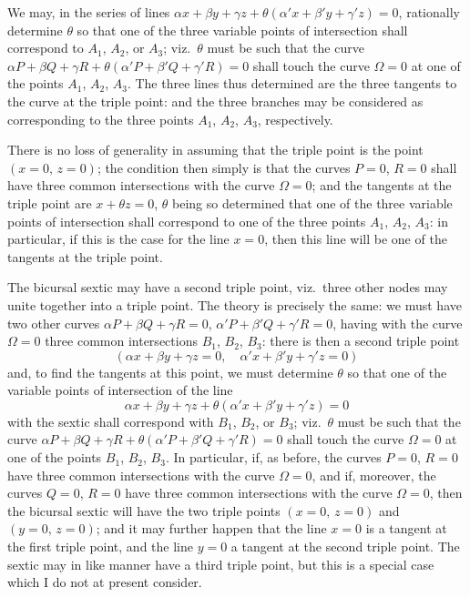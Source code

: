 \documentclass[11pt]{article}
\begin{document}
We may, in the series of lines $\alpha x + \beta y + \gamma z + \theta(\alpha' x + \beta' y + \gamma' z) = 0$, rationally determine $\theta$ so that one of the three variable points of intersection shall correspond to $A_1$, $A_2$, or $A_3$; viz.\ $\theta$ must be such that the curve $\alpha P + \beta Q + \gamma R + \theta(\alpha' P + \beta' Q + \gamma' R) = 0$ shall touch the curve $\Omega = 0$ at one of the points $A_1$, $A_2$, $A_3$. The three lines thus determined are the three tangents to the curve at the triple point: and the three branches may be considered as corresponding to the three points $A_1$, $A_2$, $A_3$, respectively.

There is no loss of generality in assuming that the triple point is the point $(x = 0,\, z = 0)$; the condition then simply is that the curves $P = 0$, $R = 0$ shall have three common intersections with the curve $\Omega = 0$; and the tangents at the triple point are $x + \theta z = 0$, $\theta$ being so determined that one of the three variable points of intersection shall correspond to one of the three points $A_1$, $A_2$, $A_3$: in particular, if this is the case for the line $x = 0$, then this line will be one of the tangents at the triple point.

The bicursal sextic may have a second triple point, viz.\ three other nodes may unite together into a triple point. The theory is precisely the same: we must have two other curves $\alpha P + \beta Q + \gamma R = 0$, $\alpha' P + \beta' Q + \gamma' R = 0$, having with the curve $\Omega = 0$ three common intersections $B_1$, $B_2$, $B_3$: there is then a second triple point
\[
(\alpha x + \beta y + \gamma z = 0,\quad \alpha' x + \beta' y + \gamma' z = 0)
\]
and, to find the tangents at this point, we must determine $\theta$ so that one of the variable points of intersection of the line
\[
\alpha x + \beta y + \gamma z + \theta(\alpha' x + \beta' y + \gamma' z) = 0
\]
with the sextic shall correspond with $B_1$, $B_2$, or $B_3$; viz.\ $\theta$ must be such that the curve $\alpha P + \beta Q + \gamma R + \theta(\alpha' P + \beta' Q + \gamma' R) = 0$ shall touch the curve $\Omega = 0$ at one of the points $B_1$, $B_2$, $B_3$. In particular, if, as before, the curves $P = 0$, $R = 0$ have three common intersections with the curve $\Omega = 0$, and if, moreover, the curves $Q = 0$, $R = 0$ have three common intersections with the curve $\Omega = 0$, then the bicursal sextic will have the two triple points $(x = 0,\, z = 0)$ and $(y = 0,\, z = 0)$; and it may further happen that the line $x = 0$ is a tangent at the first triple point, and the line $y = 0$ a tangent at the second triple point. The sextic may in like manner have a third triple point, but this is a special case which I do not at present consider.
\end{document}

